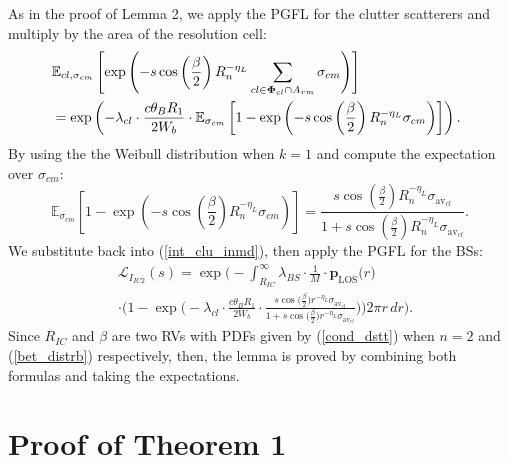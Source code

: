 \documentclass[journal]{IEEEtran}
\begin{document}
\normalsize
As in the proof of Lemma 2, we apply the PGFL for the clutter scatterers and multiply by the area of the resolution cell:
\small
\begin{equation}
\begin{aligned}[b]
\!\!\!&\mathbb{E}_{cl, \sigma_{cm}} \left[ \exp \left( - s \cos \left( \frac{\beta}{2} \right) R_n^{-\eta_L} \sum_{cl \in \bold\Phi_{cl} \cap A_{rm}} \sigma_{cm} \right) \right]\\
\!\!\!&= \exp \left( - \lambda_{cl} \cdot \frac{c \theta_B R_1}{2 W_b} \cdot \mathbb{E}_{\sigma_{cm}} \left[ 1 - \exp \left( - s \cos \left( \frac{\beta}{2} \right) R_n^{-\eta_L} \sigma_{cm} \right) \right] \right).
\end{aligned}
\end{equation}
\normalsize
By using the  the Weibull  distribution when $k = 1$ and compute the expectation over $ \sigma_{cm} $:
\small
\begin{equation}
\!\!\!\!\mathbb{E}_{\sigma_{cm}} \left[ 1 - \exp \left( - s \cos \left( \frac{\beta}{2} \right) R_n^{-\eta_L} \sigma_{cm} \right) \right] = \frac{s \cos \left( \frac{\beta}{2} \right) R_n^{-\eta_L} \sigma_{\text{av}_{cl}}}{1 + s \cos \left( \frac{\beta}{2} \right) R_n^{-\eta_L} \sigma_{\text{av}_{cl}}}.
\end{equation}
\normalsize
We substitute back into (\ref{int_clu_inmd}), then apply the PGFL for the BSs:
\small
\begin{equation}
\begin{aligned}
&\mathcal{L}_{I_{IC2}}(s) = \exp \bigg( - \int_{R_{IC}}^\infty \lambda_{BS} \cdot \frac{1}{M} \cdot \boldsymbol{p}_{\text{LOS}}\big(r\big) \\
&\cdot \bigg( 1 - \exp \bigg( - \lambda_{cl} \cdot \frac{c \theta_B R_1}{2 W_b} \cdot \frac{s \cos \bigg( \frac{\beta}{2} \bigg) r^{-\eta_L} \sigma_{\text{av}_{cl}}}{1 + s \cos \bigg( \frac{\beta}{2} \bigg) r^{-\eta_L} \sigma_{\text{av}_{cl}}} \bigg) \bigg) 2 \pi r \, dr \bigg).
\end{aligned}
\end{equation}
\normalsize
Since $R_{IC}$ and $\beta$ are two RVs with PDFs given by (\ref{cond_dstt}) when $n=2$ and (\ref{bet_distrb}) respectively,
then, the lemma is proved by combining both formulas and taking the expectations.





\section{Proof of Theorem 1}
\end{document}
